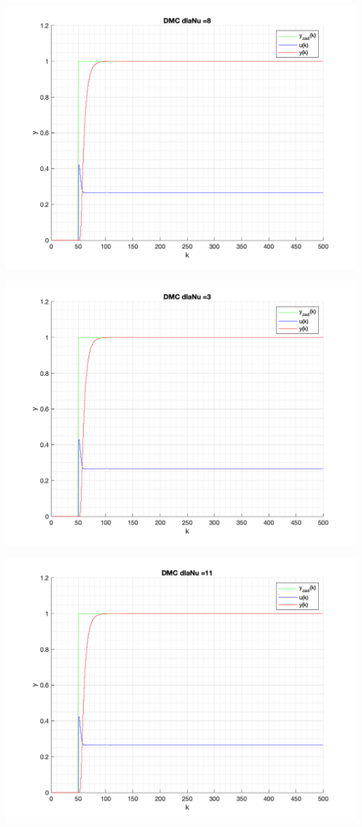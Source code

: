 \documentclass[a4paper, 11pt]{article}
\begin{document}
\begin{enumerate}
 \includegraphics[width=\linewidth]{./ModelsP4_Nu/P4_DMC_Nu_8_png.png} 
 
 \includegraphics[width=\linewidth]{./ModelsP4_Nu/P4_DMC_Nu_3_png.png} 
 
 \includegraphics[width=\linewidth]{./ModelsP4_Nu/P4_DMC_Nu_11_png.png} 
 

\end{enumerate}
\end{document}
